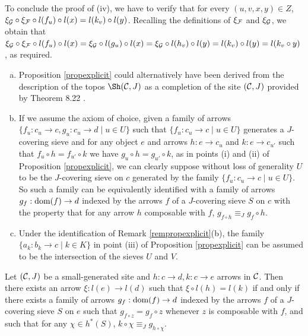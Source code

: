 \documentclass[a4paper,12pt]{article}
\begin{document}
\begin{proofs}
	To conclude the proof of (iv), we have to verify that for every $(u,v,x,y)\in Z$, $\xi_{\cal G}\circ \xi_{\cal F}\circ l(f_{u})\circ l(x)=l(k_{v})\circ l(y)$. Recalling the definitions of $\xi_{\cal F}$ and $\xi_{\cal G}$, we obtain that $\xi_{\cal G}\circ \xi_{\cal F}\circ l(f_{u})\circ l(x)=\xi_{\cal G}\circ l(g_{u})\circ l(x)=\xi_{\cal G}\circ l(h_{v})\circ l(y)=l(k_{v})\circ l(y)=l(k_{v}\circ y)$, as required.   
\end{proofs}

\begin{remarks}\label{rempropexplicit}
	\begin{enumerate}[(a)]
		\item Proposition \ref{propexplicit} could alternatively have been derived from the description of the topos $\Sh({\cal C}, J)$ as a completion of the site $({\cal C}, J)$ provided by Theorem 8.22 \cite{Shulman}.
		
		\item If we assume the axiom of choice, given a family of arrows $\{f_{u}:c_{u}\to c, g_{u}:c_{u}\to d \mid u\in U\}$ such that $\{f_{u}:c_{u}\to c \mid u\in U\}$ generates a $J$-covering sieve and for any object $e$ and arrows $h:e\to c_{u}$ and $k:e\to c_{u'}$ such that $f_{u}\circ h=f_{u'}\circ k$ we have $g_{u}\circ h=g_{u'}\circ k$, as in points (i) and (ii) of Proposition \ref{propexplicit}, we can clearly suppose without loss of generality $U$ to be the $J$-covering sieve on $c$ generated by the family $\{f_{u}:c_{u}\to c \mid u\in U\}$. So such a family can be equivalently identified with a family of arrows  $g_{f}:\textup{dom}(f)\to d$ indexed by the arrows $f$ of a $J$-covering sieve $S$ on $c$ with the property that for any arrow $h$ composable with $f$, $g_{f\circ h}\equiv_{J} g_{f}\circ h$. 
		
		\item Under the identification of Remark \ref{rempropexplicit}(b), the family $\{a_{k}:b_{k}\to c \mid k\in K\}$ in point (iii) of Proposition \ref{propexplicit} can be assumed to be the intersection of the sieves $U$ and $V$.
		
	\end{enumerate} 
\end{remarks}


\begin{proposition}
	Let $({\cal C}, J)$ be a small-generated site and $h:c\to d, k:c\to e$ arrows in $\cal C$. Then there exists an arrow $\xi:l(e)\to l(d)$ such that $\xi \circ l(h)=l(k)$ if and only if there exists a family of arrows $g_{f}:\textup{dom}(f)\to d$ indexed by the arrows $f$ of a $J$-covering sieve $S$ on $e$ such that $g_{f\circ z}=g_{f}\circ z$ whenever $z$ is composable with $f$, and such that for any $\chi\in h^{\ast}(S)$, $k\circ \chi\equiv_{J} g_{h\circ \chi}$.
\end{proposition}
\end{document}
